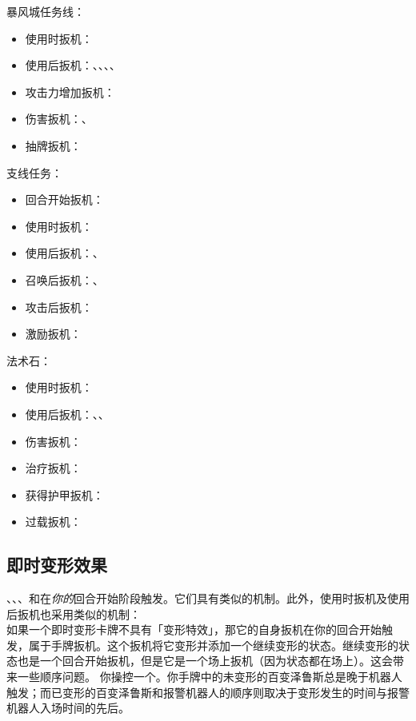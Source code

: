 暴风城任务线：
\begin{itemize}
    \item 使用时扳机：
    \item 使用后扳机：、、、、
    \item 攻击力增加扳机：
    \item 伤害扳机：、
    \item 抽牌扳机：
\end{itemize}

支线任务：
\begin{itemize}
    \item 回合开始扳机：
    \item 使用时扳机：
    \item 使用后扳机：、
    \item 召唤后扳机：、
    \item 攻击后扳机：
    \item 激励扳机：
\end{itemize}

法术石：
\begin{itemize}
    \item 使用时扳机：
    \item 使用后扳机：、、
    \item 伤害扳机：
    \item 治疗扳机：
    \item 获得护甲扳机：
    \item 过载扳机：
\end{itemize}

\subsection{即时变形效果}

、、、和在\emph{你的}回合开始阶段触发。它们具有类似的机制。此外，使用时扳机及使用后扳机也采用类似的机制：\\
如果一个即时变形卡牌不具有「变形特效」，那它的自身扳机在你的回合开始触发，属于手牌扳机。这个扳机将它变形并添加一个继续变形的状态。继续变形的状态也是一个回合开始扳机，但是它是一个场上扳机（因为状态都在场上）。这会带来一些顺序问题。
\example 你操控一个。你手牌中的未变形的百变泽鲁斯总是晚于机器人触发；而已变形的百变泽鲁斯和报警机器人的顺序则取决于变形发生的时间与报警机器人入场时间的先后。


